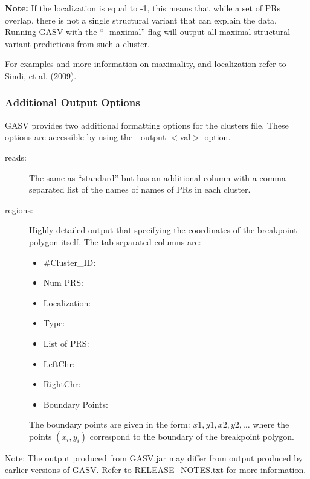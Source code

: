 \documentclass[11pt]{article}
\begin{document}
\noindent \textbf{Note:} If the localization is equal to -1, this means that while a set
of PRs overlap, there is not a single structural variant that can
explain the data. Running GASV with the ``-{}-maximal'' flag will output
all maximal structural variant predictions from such a cluster.

For examples and more information on maximality, and localization
refer to Sindi, et al. (2009).

\subsubsection{Additional Output Options}
\label{add_out_opt}
GASV provides two additional formatting options for the clusters file. These options are accessible by using the -{}-output $<$val$>$ option.

\begin{framed}
\begin{description}
\item[reads:]   The same as ``standard'' but has an additional column with a comma separated list of the names of names of PRs in each cluster. 

\item[regions:] Highly detailed output that specifying the coordinates
                         of the breakpoint polygon itself. The tab separated columns are:
                         \begin{itemize}
                         \item[] \#Cluster\_ID:	
                         \item[] Num PRS:
                         \item[] Localization:	
                         \item[] Type:	
                         \item[] List of PRS:	 
                         \item[]LeftChr:	
                         \item[] RightChr:
			\item[] Boundary Points:
			\end{itemize}
			The boundary points are given in the form: $x1, y1, x2, y2, \ldots$ where the points $(x_i,y_i)$ correspond to the boundary of the breakpoint polygon.
\end{description}
\end{framed}


\noindent Note: The output produced from GASV.jar may differ from output produced by earlier versions of GASV. Refer to RELEASE\_NOTES.txt for more information.
\clearpage
\end{document}
